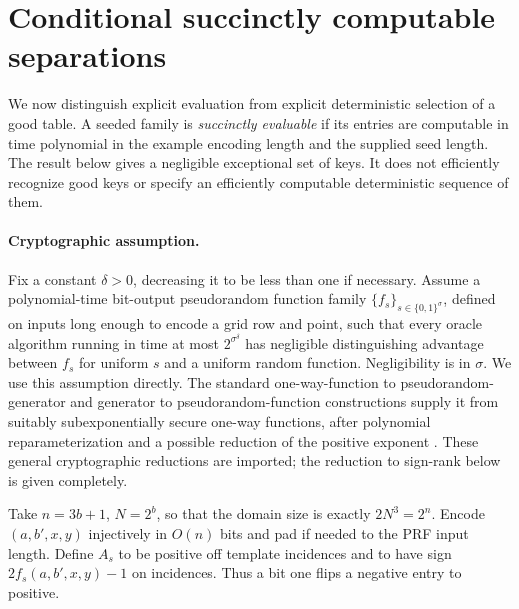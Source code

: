 \section{Conditional succinctly computable separations}\label{sec:prf}
We now distinguish explicit evaluation from explicit deterministic selection of a good table. A seeded family is \emph{succinctly evaluable} if its entries are computable in time polynomial in the example encoding length and the supplied seed length. The result below gives a negligible exceptional set of keys. It does not efficiently recognize good keys or specify an efficiently computable deterministic sequence of them.

\paragraph{Cryptographic assumption.}
Fix a constant $\delta>0$, decreasing it to be less than one if necessary. Assume a polynomial-time bit-output pseudorandom function family $\{f_s\}_{s\in\{0,1\}^\sigma}$, defined on inputs long enough to encode a grid row and point, such that every oracle algorithm running in time at most $2^{\sigma^\delta}$ has negligible distinguishing advantage between $f_s$ for uniform $s$ and a uniform random function. Negligibility is in $\sigma$. We use this assumption directly. The standard one-way-function to pseudorandom-generator and generator to pseudorandom-function constructions supply it from suitably subexponentially secure one-way functions, after polynomial reparameterization and a possible reduction of the positive exponent \citep{HILL99,GGM86}. These general cryptographic reductions are imported; the reduction to sign-rank below is given completely.

Take $n=3b+1$, $N=2^b$, so that the domain size is exactly $2N^3=2^n$. Encode $(a,b',x,y)$ injectively in $O(n)$ bits and pad if needed to the PRF input length. Define $A_s$ to be positive off template incidences and to have sign $2f_s(a,b',x,y)-1$ on incidences. Thus a bit one flips a negative entry to positive.

